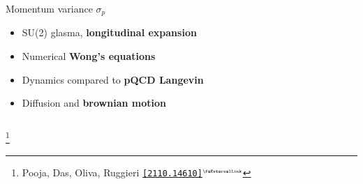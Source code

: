\documentclass[aspectratio=169,11pt,usenames,dvipsnames]{beamer}
\renewcommand{\thefootnote}{\color{customblue}\faPaperPlaneO}
\newcommand\blfootnote[1]{%
  \begingroup
  \renewcommand\thefootnote{}\footnote{#1}%
  \addtocounter{footnote}{-1}%
  \endgroup
}
\begin{document}
\begin{frame}[t]
\begin{columns}[onlytextwidth,t]
        \begin{center}
            {\Large\color{palteal} Momentum variance $\sigma_p$ \\[10pt]}
            \footnotesize
                \begin{itemize}
                    \item {\color{lightgray}SU(2) glasma, {\bfseries longitudinal expansion}}
                    \item {\color{lightgray}Numerical {\bfseries Wong's equations}}
                    \item {\color{lightgray}Dynamics compared to {\bfseries pQCD Langevin}}
                    \item {\color{lightgray}Diffusion and {\bfseries brownian motion}}
                \end{itemize}
        \end{center}
    \end{columns}
    \blfootnote{\scriptsize Pooja, Das, Oliva, Ruggieri \href{https://arxiv.org/abs/2110.14610}{\color{palgold}\texttt{[2110.14610]}$^\text{\tiny\faExternalLink}$}}
\end{frame}



\end{document}
